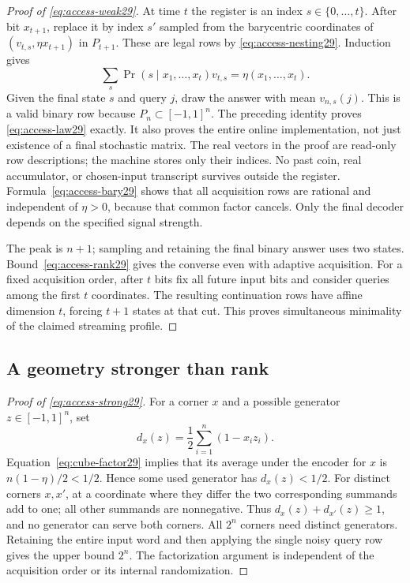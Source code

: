 \begin{proof}[Proof of \eqref{eq:access-weak29}]
At time $t$ the register is an index $s\in\{0,\ldots,t\}$.
After bit $x_{t+1}$, replace it by index $s'$ sampled from the
barycentric coordinates of $(v_{t,s},\eta x_{t+1})$ in $P_{t+1}$.
These are legal rows by \eqref{eq:access-nesting29}. Induction gives
\[
 \sum_s\Pr(s\mid x_1,\ldots,x_t)v_{t,s}
                         =\eta(x_1,\ldots,x_t).
\]
Given the final state $s$ and query $j$, draw the answer with mean
$v_{n,s}(j)$. This is a valid binary row because $P_n\subset[-1,1]^n$.
The preceding identity proves \eqref{eq:access-law29} exactly.
It also proves the entire online implementation, not just existence
of a final stochastic matrix. The real vectors in the proof are
read-only row descriptions; the machine stores only their indices.
No past coin, real accumulator, or chosen-input transcript survives
outside the register. Formula~\eqref{eq:access-bary29} shows that all
acquisition rows are rational and independent of $\eta>0$, because
that common factor cancels. Only the final decoder depends on the
specified signal strength.

The peak is $n+1$; sampling and retaining the final binary answer uses
two states. Bound~\eqref{eq:access-rank29} gives the converse even with
adaptive acquisition. For a fixed acquisition order, after $t$ bits
fix all future input bits and consider queries among the first $t$
coordinates. The resulting continuation rows have affine dimension
$t$, forcing $t+1$ states at that cut. This proves simultaneous
minimality of the claimed streaming profile.
\end{proof}

\subsection{A geometry stronger than rank}
\begin{proof}[Proof of \eqref{eq:access-strong29}]
For a corner $x$ and a possible generator $z\in[-1,1]^n$, set
\[
                        d_x(z)=\frac12\sum_{i=1}^n(1-x_i z_i).
\]
Equation~\eqref{eq:cube-factor29} implies that its average under the
encoder for $x$ is $n(1-\eta)/2<1/2$. Hence some used generator has
$d_x(z)<1/2$. For distinct corners $x,x'$, at a coordinate where they
differ the two corresponding summands add to one; all other summands
are nonnegative. Thus $d_x(z)+d_{x'}(z)\ge1$, and no generator can
serve both corners. All $2^n$ corners need distinct generators.
Retaining the entire input word and then applying the single noisy
query row gives the upper bound $2^n$. The factorization argument is
independent of the acquisition order or its internal randomization.
\end{proof}


